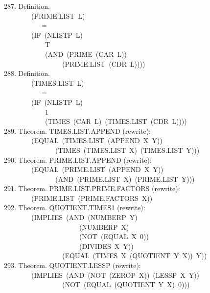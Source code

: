 \documentclass[10pt]{book}
\newenvironment{pubasis}{\begin{flushleft}}{\end{flushleft}}
\begin{document}
\begin{pubasis}
287.    Definition.\\
~~~~~~~~(PRIME.LIST~L)\\
~~~~~~~~~~~=\\
~~~~~~~~(IF~(NLISTP~L)\\
~~~~~~~~~~~~T\\
~~~~~~~~~~~~(AND~(PRIME~(CAR~L))\\
~~~~~~~~~~~~~~~~~(PRIME.LIST~(CDR~L))))\\

288.    Definition.\\
~~~~~~~~(TIMES.LIST~L)\\
~~~~~~~~~~~=\\
~~~~~~~~(IF~(NLISTP~L)\\
~~~~~~~~~~~~1\\
~~~~~~~~~~~~(TIMES~(CAR~L)~(TIMES.LIST~(CDR~L))))\\

289.    Theorem.  TIMES.LIST.APPEND (rewrite):\\
~~~~~~~~(EQUAL~(TIMES.LIST~(APPEND~X~Y))\\
~~~~~~~~~~~~~~~(TIMES~(TIMES.LIST~X)~(TIMES.LIST~Y)))\\

290.    Theorem.  PRIME.LIST.APPEND (rewrite):\\
~~~~~~~~(EQUAL~(PRIME.LIST~(APPEND~X~Y))\\
~~~~~~~~~~~~~~~(AND~(PRIME.LIST~X)~(PRIME.LIST~Y)))\\

291.    Theorem.  PRIME.LIST.PRIME.FACTORS (rewrite):\\
~~~~~~~~(PRIME.LIST~(PRIME.FACTORS~X))\\

292.    Theorem.  QUOTIENT.TIMES1 (rewrite):\\
~~~~~~~~(IMPLIES~(AND~(NUMBERP~Y)\\
~~~~~~~~~~~~~~~~~~~~~~(NUMBERP~X)\\
~~~~~~~~~~~~~~~~~~~~~~(NOT~(EQUAL~X~0))\\
~~~~~~~~~~~~~~~~~~~~~~(DIVIDES~X~Y))\\
~~~~~~~~~~~~~~~~~(EQUAL~(TIMES~X~(QUOTIENT~Y~X))~Y))\\

293.    Theorem.  QUOTIENT.LESSP (rewrite):\\
~~~~~~~~(IMPLIES~(AND~(NOT~(ZEROP~X))~(LESSP~X~Y))\\
~~~~~~~~~~~~~~~~~(NOT~(EQUAL~(QUOTIENT~Y~X)~0)))\\


\end{pubasis}
\end{document}
